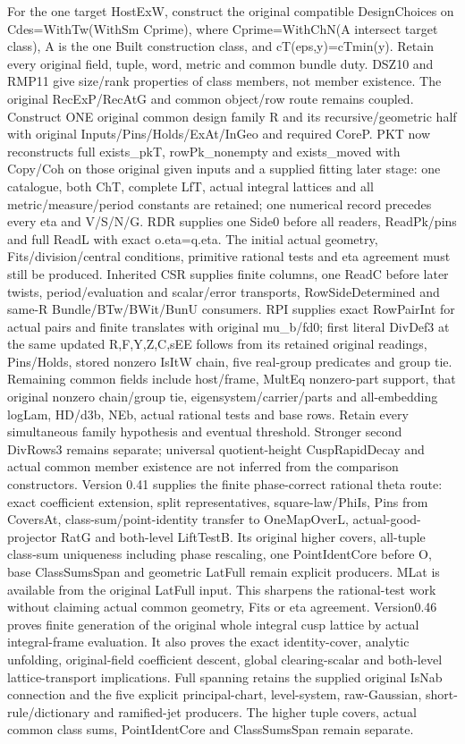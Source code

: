 For the one target HostExW, construct the original compatible DesignChoices on Cdes=WithTw(WithSm Cprime), where Cprime=WithChN(A intersect target class), A is the one Built construction class, and cT(eps,y)=cTmin(y). Retain every original field, tuple, word, metric and common bundle duty. DSZ10 and RMP11 give size/rank properties of class members, not member existence. The original RecExP/RecAtG and common object/row route remains coupled. Construct ONE original common design family R and its recursive/geometric half with original Inputs/Pins/Holds/ExAt/InGeo and required CoreP. PKT now reconstructs full exists\_\allowbreak pkT, rowPk\_\allowbreak nonempty and exists\_\allowbreak moved with Copy/Coh on those original given inputs and a supplied fitting later stage: one catalogue, both ChT, complete LfT, actual integral lattices and all metric/measure/period constants are retained; one numerical record precedes every eta and V/S/N/G. RDR supplies one Side0 before all readers, ReadPk/pins and full ReadL with exact o.eta=q.eta. The initial actual geometry, Fits/division/central conditions, primitive rational tests and eta agreement must still be produced. Inherited CSR supplies finite columns, one ReadC before later twists, period/evaluation and scalar/error transports, RowSideDetermined and same-R Bundle/BTw/BWit/BunU consumers. RPI supplies exact RowPairInt for actual pairs and finite translates with original mu\_\allowbreak b/fd0; first literal DivDef3 at the same updated R,F,Y,Z,C,sEE follows from its retained original readings, Pins/Holds, stored nonzero IsItW chain, five real-group predicates and group tie. Remaining common fields include host/frame, MultEq nonzero-part support, that original nonzero chain/group tie, eigensystem/carrier/parts and all-embedding logLam, HD/d3b, NEb, actual rational tests and base rows. Retain every simultaneous family hypothesis and eventual threshold. Stronger second DivRows3 remains separate; universal quotient-height CuspRapidDecay and actual common member existence are not inferred from the comparison constructors. Version 0.41 supplies the finite phase-correct rational theta route: exact coefficient extension, split representatives, square-law/PhiIs, Pins from CoversAt, class-sum/point-identity transfer to OneMapOverL, actual-good-projector RatG and both-level LiftTestB. Its original higher covers, all-tuple class-sum uniqueness including phase rescaling, one PointIdentCore before O, base ClassSumsSpan and geometric LatFull remain explicit producers. MLat is available from the original LatFull input. This sharpens the rational-test work without claiming actual common geometry, Fits or eta agreement. Version0.46 proves finite generation of the original whole integral cusp lattice by actual integral-frame evaluation. It also proves the exact identity-cover, analytic unfolding, original-field coefficient descent, global clearing-scalar and both-level lattice-transport implications. Full spanning retains the supplied original IsNab connection and the five explicit principal-chart, level-system, raw-Gaussian, short-rule/dictionary and ramified-jet producers. The higher tuple covers, actual common class sums, PointIdentCore and ClassSumsSpan remain separate.

